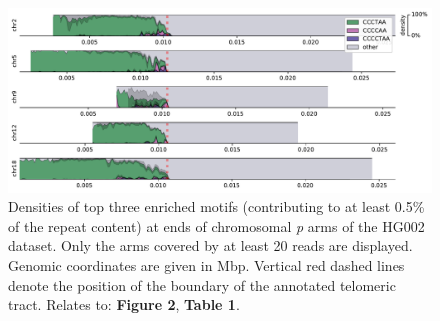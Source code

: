 \documentclass{article}
\begin{document}
\begin{figure}[ht!] \centering
\includegraphics[height=.9\textheight,width=\textwidth,keepaspectratio]{figures/threemotifp/HG002-densityplot-p_arm-threemotifp.pdf}
\caption{
    Densities of top three enriched motifs (contributing to at least 0.5\% of the repeat content) at ends of chromosomal \textit{p} arms of the HG002 dataset.
    Only the arms covered by at least 20 reads are displayed.
    Genomic coordinates are given in Mbp.
    Vertical red dashed lines denote the position of the boundary of the annotated telomeric tract.
    Relates to: \textbf{Figure 2}, \textbf{Table 1}.
}
\label{fig:hg002_densityplot_p_arm}
\end{figure}
\clearpage \pagebreak
\end{document}
